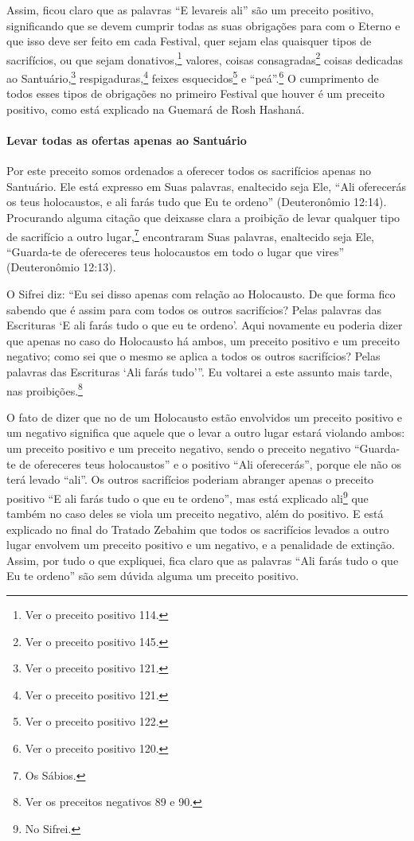 Assim, ficou claro que as palavras ``E levareis ali'' são um preceito
positivo, significando que se devem cumprir todas as suas obrigações
para com o Eterno e que isso deve ser feito em cada Festival, quer sejam elas
quaisquer tipos de sacrifícios, ou que sejam donativos,\footnote{Ver o preceito positivo 114.} valores, coisas consagradas\footnote{Ver o preceito positivo 145.} coisas dedicadas ao
Santuário,\footnote{Ver o preceito positivo 121.} respigaduras,\footnote{Ver o preceito positivo 121.}
feixes esquecidos\footnote{Ver o preceito positivo 122.} e ``peá''.\footnote{Ver o preceito positivo 120.}
O cumprimento de todos esses tipos de obrigações no primeiro Festival
que houver é um preceito positivo, como está explicado na Guemará de
Rosh Hashaná.

\paragraph{Levar todas as ofertas apenas ao Santuário}

Por este preceito somos ordenados a oferecer todos os sacrifícios apenas
no Santuário. Ele está expresso em Suas palavras, enaltecido seja Ele,
``Ali oferecerás os teus holocaustos, e ali farás tudo que Eu te
ordeno'' (Deuteronômio 12:14). Procurando alguma citação que deixasse
clara a proibição de levar qualquer tipo de sacrifício a outro
lugar,\footnote{Os Sábios.} encontraram Suas palavras, enaltecido seja
Ele, ``Guarda-te de ofereceres teus holocaustos em todo o lugar que
vires'' (Deuteronômio 12:13).

O Sifrei diz: ``Eu sei disso apenas com relação ao Holocausto. De que
forma fico sabendo que é assim para com todos os outros sacrifícios?
Pelas palavras das Escrituras `E ali farás tudo o que eu te ordeno'.
Aqui novamente eu poderia dizer que apenas no caso do Holocausto há
ambos, um preceito positivo e um preceito negativo; como sei que o mesmo se aplica a todos os outros
sacrifícios? Pelas palavras das Escrituras `Ali farás tudo'''. Eu
voltarei a este assunto mais tarde, nas proibições.\footnote{Ver os preceitos negativos 89 e 90.}

O fato de dizer que no de um Holocausto estão envolvidos um preceito
positivo e um negativo significa que aquele que o levar a outro lugar
estará violando ambos: um preceito positivo e um preceito negativo,
sendo o preceito negativo ``Guarda-te de ofereceres teus holocaustos'' e
o positivo ``Ali oferecerás'', porque ele não os terá levado ``ali''. Os outros
sacrifícios poderiam abranger apenas o preceito positivo ``E ali farás tudo o que eu te
ordeno'', mas está explicado ali\footnote{No Sifrei.} que também no caso deles se
viola um preceito negativo, além do positivo. E está explicado no final do Tratado Zebahim que todos
os sacrifícios levados a outro lugar envolvem um preceito positivo e um
negativo, e a penalidade de extinção. Assim, por
tudo o que expliquei, fica claro que as palavras ``Ali farás tudo o que
Eu te ordeno'' são sem dúvida alguma um preceito positivo.

